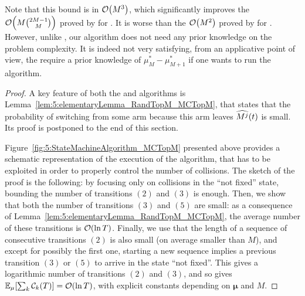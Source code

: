 Note that this bound is in $\mathop{}\mathopen{}\mathcal{O}\mathopen{}\left(M^3\right)$,
which significantly improves the $\mathop{}\mathopen{}\mathcal{O}\mathopen{}\left(M{2M-1 \choose M}\right)$ proved by \cite{Anandkumar11} for \rhoRand. It is worse than the $\mathop{}\mathopen{}\mathcal{O}\mathopen{}\left(M^2\right)$ proved by \cite{Rosenski16} for \MusicalChair{}. %
However, unlike \MusicalChair, our algorithm does not need any prior knowledge on the problem complexity.
It is indeed not very satisfying, from an applicative point of view, the require a prior knowledge
of $\mu^*_{M}-\mu^*_{M+1}$ if one wants to run the \MusicalChair{} algorithm.

\begin{proof}
  A key feature of both the \RandTopM{} and \MCTopM{} algorithms is Lemma~\ref{lem:5:elementaryLemma_RandTopM_MCTopM}, that states that the probability of switching from some arm because this arm leaves $\widehat{M^j}(t)$ is small. Its proof is postponed to the end of this section.


  Figure~\ref{fig:5:StateMachineAlgorithm_MCTopM} presented above provides a schematic representation of the execution of the \MCTopM{} algorithm, that has to be exploited in order to properly control the number of collisions.
  The sketch of the proof is the following: by focusing only on collisions in the ``not fixed'' state, bounding the number of transitions $(2)$ and $(3)$ is enough.
  Then, we show that both the number of transitions $(3)$ and $(5)$ are small: as a consequence of Lemma~\ref{lem:5:elementaryLemma_RandTopM_MCTopM}, the average number of these transitions is $\mathop{}\mathopen{}\mathcal{O}\mathopen{}\left(\ln T\right)$.
  Finally, we use that the length of a sequence of consecutive transitions $(2)$ is also small (on average smaller than $M$), and except for possibly the first one, starting a new sequence implies a previous transition $(3)$ or $(5)$ to arrive in the state ``not fixed''. This gives a logarithmic number of transitions $(2)$ and $(3)$, and so gives $\mathbb{E}_{\mu}[\sum_k\mathcal{C}_k(T)] = \mathop{}\mathopen{}\mathcal{O}\mathopen{}\left(\ln T\right)$,
  with explicit constants depending on $\boldsymbol{\mu}$ and $M$.


\end{proof}
